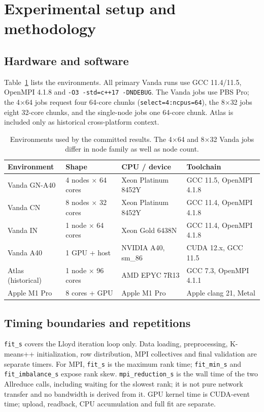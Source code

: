 \documentclass[10pt,a4paper]{article}
\newcommand{\code}[1]{\texttt{#1}}
\begin{document}
\section{Experimental setup and methodology}
\subsection{Hardware and software}
Table~\ref{tab:hardware} lists the environments. All primary Vanda runs use
GCC 11.4/11.5, OpenMPI 4.1.8 and \code{-O3 -std=c++17 -DNDEBUG}. The Vanda
jobs use PBS Pro; the 4$\times$64 jobs request four 64-core chunks
(\code{select=4:ncpus=64}), the 8$\times$32 jobs eight 32-core chunks, and the
single-node jobs one 64-core chunk. Atlas is included only as historical
cross-platform context.

\begin{table}[H]
\centering\small
\caption{Environments used by the committed results. The 4$\times$64 and
8$\times$32 Vanda jobs differ in node family as well as node count.}
\label{tab:hardware}
\begin{tabular}{llll}
\toprule
Environment & Shape & CPU / device & Toolchain \\
\midrule
Vanda GN-A40 & 4 nodes $\times$ 64 cores & Xeon Platinum 8452Y & GCC 11.5, OpenMPI 4.1.8 \\
Vanda CN & 8 nodes $\times$ 32 cores & Xeon Platinum 8452Y & GCC 11.4, OpenMPI 4.1.8 \\
Vanda IN & 1 node $\times$ 64 cores & Xeon Gold 6438N & GCC 11.4, OpenMPI 4.1.8 \\
Vanda A40 & 1 GPU + host & NVIDIA A40, sm\_86 & CUDA 12.x, GCC 11.5 \\
Atlas (historical) & 1 node $\times$ 96 cores & AMD EPYC 7R13 & GCC 7.3, OpenMPI 4.1.1 \\
Apple M1 Pro & 8 cores + GPU & Apple M1 Pro & Apple clang 21, Metal \\
\bottomrule
\end{tabular}
\end{table}

\subsection{Timing boundaries and repetitions}
\code{fit\_s} covers the Lloyd iteration loop only. Data loading, preprocessing,
K-means++ initialization, row distribution, MPI collectives and final
validation are separate timers. For MPI, \code{fit\_s} is the maximum rank time;
\code{fit\_min\_s} and \code{fit\_imbalance\_s} expose rank skew.
\code{mpi\_reduction\_s} is the wall time of the two Allreduce calls, including
waiting for the slowest rank; it is not pure network transfer and no bandwidth
is derived from it. GPU kernel time is CUDA-event time; upload, readback, CPU
accumulation and full fit are separate.
\end{document}
